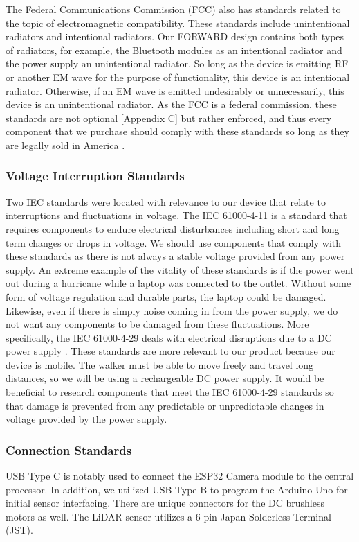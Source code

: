 \noindent The Federal Communications Commission (FCC) also has standards related to the topic of electromagnetic compatibility. These standards include unintentional radiators and intentional radiators. Our FORWARD design contains both types of radiators, for example, the Bluetooth modules as an intentional radiator and the power supply an unintentional radiator. So long as the device is emitting RF or another EM wave for the purpose of functionality, this device is an intentional radiator. Otherwise, if an EM wave is emitted undesirably or unnecessarily, this device is an unintentional radiator. As the FCC is a federal commission, these standards are not optional [Appendix C] but rather enforced, and thus every component that we purchase should comply with these standards so long as they are legally sold in America \cite{fcc_unintentional_radiators} \cite{fcc_intentional_radiators}.

\subsubsection{Voltage Interruption Standards}
\noindent Two IEC standards were located with relevance to our device that relate to interruptions and fluctuations in voltage. The IEC 61000-4-11\cite{iec_standard_2} is a standard that requires components to endure electrical disturbances including short and long term changes or drops in voltage. We should use components that comply with these standards as there is not always a stable voltage provided from any power supply. An extreme example of the vitality of these standards is if the power went out during a hurricane while a laptop was connected to the outlet. Without some form of voltage regulation and durable parts, the laptop could be damaged. Likewise, even if there is simply noise coming in from the power supply, we do not want any components to be damaged from these fluctuations. More specifically, the IEC 61000-4-29 deals with electrical disruptions due to a DC power supply \cite{iec_standard_3}. These standards are more relevant to our product because our device is mobile. The walker must be able to move freely and travel long distances, so we will be using a rechargeable DC power supply. It would be beneficial to research components that meet the IEC 61000-4-29 standards so that damage is prevented from any predictable or unpredictable changes in voltage provided by the power supply.\\


\subsubsection{Connection Standards}
\noindent USB Type C is notably used to connect the ESP32 Camera module to the central processor. In addition, we utilized USB Type B to program the Arduino Uno for initial sensor interfacing. There are unique connectors for the DC brushless motors as well. The LiDAR sensor utilizes a 6-pin Japan Solderless Terminal (JST).


